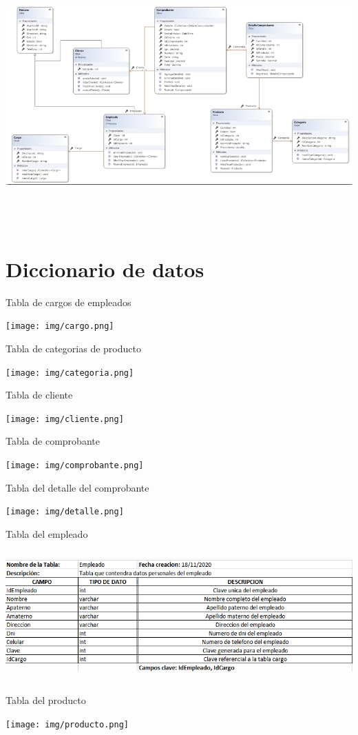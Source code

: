 \documentclass[12pt,letterpaper]{article}
\begin{document}
\begin{center}
    \includegraphics[width=18cm, height=10cm]{img/casos2.png}  
\end{center}

\section{Diccionario de datos}

Tabla de cargos de empleados
\begin{center}
    \texttt{[image: img/cargo.png]}  
\end{center}
Tabla de categorias de producto
\begin{center}
    \texttt{[image: img/categoria.png]}  
\end{center}
\newpage
Tabla de cliente
\begin{center}
    \texttt{[image: img/cliente.png]}  
\end{center}
Tabla de comprobante
\begin{center}
    \texttt{[image: img/comprobante.png]}  
\end{center}
Tabla del detalle del comprobante
\begin{center}
    \texttt{[image: img/detalle.png]}  
\end{center}
Tabla del empleado
\begin{center}
    \includegraphics[width=14cm, height=5cm]{img/empleado.png}  
\end{center}
\newpage
Tabla del producto
\begin{center}
    \texttt{[image: img/producto.png]}  
\end{center}
\end{document}
